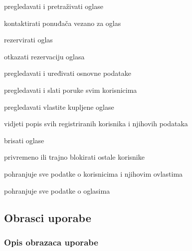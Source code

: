 \begin{packed_enum}
\begin{packed_enum}
			\end{packed_enum}
			
			\item {}
			
			\begin{packed_enum}
				\item pregledavati i pretraživati oglase
				\item kontaktirati ponuđača vezano za oglas
				\item rezervirati oglas
				\item otkazati rezervaciju oglasa
				\item pregledavati i uređivati osnovne podatake
				\item pregledavati i slati poruke svim korisnicima
				\item pregledavati vlastite kupljene oglase
				\item vidjeti popis svih registriranih korisnika i njihovih podataka
				\item brisati oglase
				\item privremeno ili trajno blokirati ostale korisnike
				
			\end{packed_enum}
			
			\item {}
			
			\begin{packed_enum}
				\item pohranjuje sve podatke o korisnicima i njihovim ovlastima
				\item pohranjuje sve podatke o oglasima
				
				
			\end{packed_enum}
		\end{packed_enum}
		
		\eject 
			
				
			\subsection{Obrasci uporabe}
				
			
				
				\subsubsection{Opis obrazaca uporabe}
					

